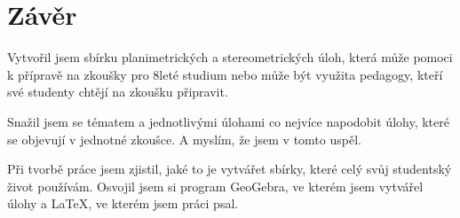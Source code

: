 \chapter*{Závěr}

Vytvořil jsem sbírku planimetrických a stereometrických úloh, která může pomoci k přípravě na zkoušky pro 8leté studium nebo může být využita pedagogy, kteří své studenty chtějí na zkoušku připravit.

Snažil jsem se tématem a jednotlivými úlohami co nejvíce napodobit úlohy, které se objevují v jednotné zkoušce. A myslím, že jsem v tomto uspěl.

Při tvorbě práce jsem zjistil, jaké to je vytvářet sbírky, které celý svůj studentský život používám. Osvojil jsem si program GeoGebra, ve kterém jsem vytvářel úlohy a \LaTeX, ve kterém jsem práci psal.
